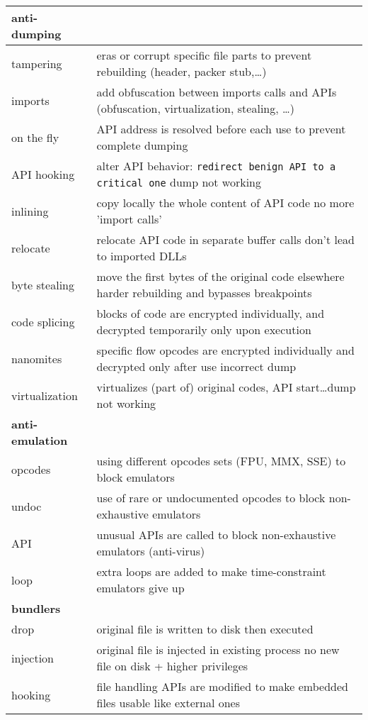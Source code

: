\begin{tabular}{ll}
\midrule
{\bf anti-dumping} \\
\midrule
tampering		& eras or corrupt specific file parts to prevent rebuilding (header, packer stub,\ldots) \\
imports 		& add obfuscation between imports calls and APIs (obfuscation, virtualization, stealing, \ldots)\\
on the fly		& API address is resolved before each use to prevent complete dumping \\
API hooking		& alter API behavior: {\tt redirect benign API to a critical one} \ra dump not working \\
inlining		& copy locally the whole content of API code \ra no more 'import calls'\\
relocate		& relocate API code in separate buffer \ra calls don't lead to imported DLLs\\
byte stealing	& move the first bytes of the original code elsewhere \ra harder rebuilding and bypasses breakpoints\\
code splicing 	& blocks of code are encrypted individually, and decrypted temporarily only upon execution \\
nanomites		& specific flow opcodes are encrypted individually and decrypted only after use \ra incorrect dump\\
virtualization	& virtualizes (part of) original codes, API start\ldots \ra dump not working \\

\midrule
{\bf anti-emulation} \\
\midrule
opcodes		& using different opcodes sets (FPU, MMX, SSE) to block emulators\\
undoc			& use of rare or undocumented opcodes to block non-exhaustive emulators \\
API			& unusual APIs are called to block non-exhaustive emulators (anti-virus)\\
loop			& extra loops are added to make time-constraint emulators give up \\
\midrule
{\bf bundlers} \\
\midrule
drop			& original file is written to disk then executed \\
injection		& original file is injected in existing process \ra no new file on disk + higher privileges \\
hooking		& file handling APIs are modified to make embedded files usable like external ones\\

\bottomrule

\end{tabular}


\sig

